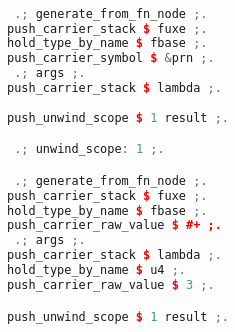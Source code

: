 \begin{lstlisting}[caption={Example PVMIR Code},
language = C++, numbers = none, label={lst:figPVM},
    basicstyle = \ttfamily\bfseries\tiny, linewidth = .95\linewidth] 

 .; generate_from_fn_node ;.
push_carrier_stack $ fuxe ;.
hold_type_by_name $ fbase ;.
push_carrier_symbol $ &prn ;.
 .; args ;.
push_carrier_stack $ lambda ;.
 
push_unwind_scope $ 1 result ;.

 .; unwind_scope: 1 ;.

 .; generate_from_fn_node ;.
push_carrier_stack $ fuxe ;.
hold_type_by_name $ fbase ;.
push_carrier_raw_value $ #+ ;.
 .; args ;.
push_carrier_stack $ lambda ;.
hold_type_by_name $ u4 ;.
push_carrier_raw_value $ 3 ;.

push_unwind_scope $ 1 result ;.

\end{lstlisting}
\begin{tikzpicture}[remember picture, overlay, text width=.95\linewidth]


\end{tikzpicture} 
